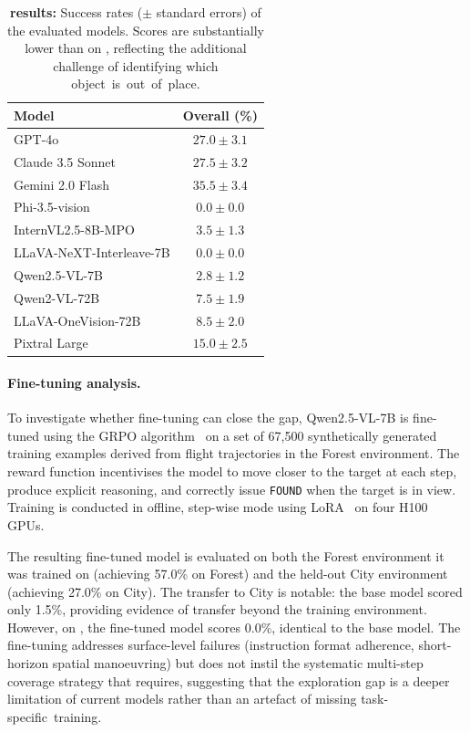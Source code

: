 \begin{table}[t]
    \centering
    \begin{footnotesize}
    \caption[Benchmark results on \anomalychallenge{}]{\textbf{\anomalychallenge{} results:} Success rates ($\pm$ standard errors) of the evaluated models. Scores are substantially lower than on \challenge{}, reflecting the additional challenge of identifying which object~is~out~of~place.}
    \label{tab:flysearch-anomaly}
    \begin{tabular}{lc}
        \toprule
        Model & Overall (\%) \\
        \midrule
        GPT-4o & $27.0 \pm 3.1$ \\
        Claude 3.5 Sonnet & $27.5 \pm 3.2$ \\
        Gemini 2.0 Flash & $\mathbf{35.5 \pm 3.4}$ \\
        \midrule
        Phi-3.5-vision & $0.0 \pm 0.0$ \\
        InternVL2.5-8B-MPO & $3.5 \pm 1.3$ \\
        LLaVA-NeXT-Interleave-7B & $0.0 \pm 0.0$ \\
        Qwen2.5-VL-7B & $2.8 \pm 1.2$ \\
        \midrule
        Qwen2-VL-72B & $7.5 \pm 1.9$ \\
        LLaVA-OneVision-72B & $8.5 \pm 2.0$ \\
        Pixtral Large & $15.0 \pm 2.5$ \\
        \bottomrule
    \end{tabular}
    \end{footnotesize}
\end{table}

\paragraph{Fine-tuning analysis.} To investigate whether fine-tuning can close the gap, Qwen2.5-VL-7B is fine-tuned using the GRPO algorithm~\cite{shao2024deepseekmath} on a set of 67,500 synthetically generated training examples derived from flight trajectories in the Forest environment. The reward function incentivises the model to move closer to the target at each step, produce explicit reasoning, and correctly issue \texttt{FOUND} when the target is in view. Training is conducted in offline, step-wise mode using LoRA~\cite{hu2022lora} on four H100 GPUs.

The resulting fine-tuned model is evaluated on both the Forest environment it was trained on (achieving 57.0\% on \challenge{} Forest) and the held-out City environment (achieving 27.0\% on \challenge{} City). The transfer to City is notable: the base model scored only 1.5\%, providing evidence of transfer beyond the training environment. However, on \hardchallenge{}, the fine-tuned model scores 0.0\%, identical to the base model. The fine-tuning addresses surface-level failures (instruction format adherence, short-horizon spatial manoeuvring) but does not instil the systematic multi-step coverage strategy that \hardchallenge{} requires, suggesting that the exploration gap is a deeper limitation of current models rather than an artefact of missing task-specific~training.

